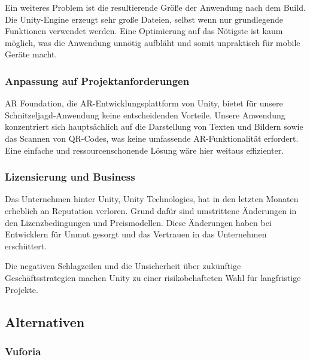 Ein weiteres Problem ist die resultierende Größe der Anwendung nach dem Build. Die Unity-Engine erzeugt sehr große Dateien, selbst wenn nur grundlegende Funktionen verwendet werden. Eine Optimierung auf das Nötigste ist kaum möglich, was die Anwendung unnötig aufbläht und somit unpraktisch für mobile Geräte macht.

\subsubsection{Anpassung auf Projektanforderungen}

AR Foundation, die AR-Entwicklungsplattform von Unity, bietet für unsere Schnitzeljagd-Anwendung keine entscheidenden Vorteile. Unsere Anwendung konzentriert sich hauptsächlich auf die Darstellung von Texten und Bildern sowie das Scannen von QR-Codes, was keine umfassende AR-Funktionalität erfordert. Eine einfache und ressourcenschonende Lösung wäre hier weitaus effizienter.

\subsubsection{Lizensierung und Business}

Das Unternehmen hinter Unity, Unity Technologies, hat in den letzten Monaten erheblich an Reputation verloren. Grund dafür sind umstrittene Änderungen in den Lizenzbedingungen und Preismodellen. Diese Änderungen haben bei Entwicklern für Unmut gesorgt und das Vertrauen in das Unternehmen erschüttert. \autocite{Unity2024:PriceChange}

Die negativen Schlagzeilen und die Unsicherheit über zukünftige Geschäftsstrategien machen Unity zu einer risikobehafteten Wahl für langfristige Projekte.

\subsection{Alternativen}

\subsubsection{Vuforia}
